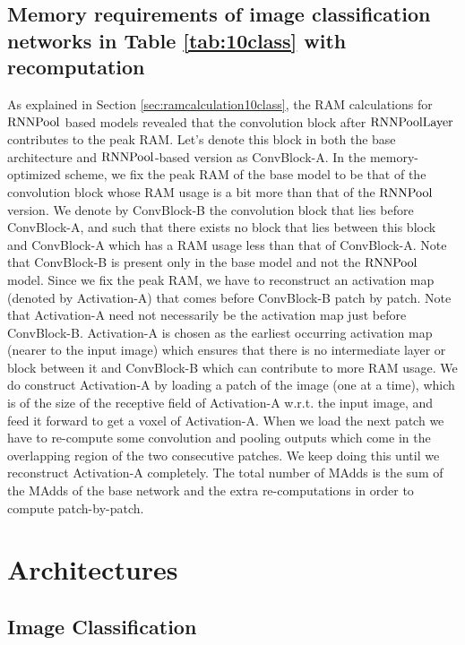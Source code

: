 \documentclass[10pt]{article}
\newcommand{\rpool}{\ensuremath{{\rm RNNPool}}\xspace}
\newcommand{\rpoollayer}{\ensuremath{{\rm RNNPoolLayer}}\xspace}
\begin{document}
\subsection{Memory requirements of image classification networks in Table \ref{tab:10class} with recomputation}
\label{sec:with-recomp}


As explained in Section \ref{sec:ramcalculation10class}, the RAM
calculations for \rpool based models revealed that the convolution
block after \rpoollayer contributes to the peak RAM. Let's denote this
block in both the base architecture and \rpool-based version as
ConvBlock-A. In the memory-optimized scheme, we fix the peak RAM of
the base model to be that of the convolution block whose RAM usage is
a bit more than that of the \rpool version. We denote by ConvBlock-B the
convolution block that lies before ConvBlock-A, and such that there
exists no block that lies between this block and ConvBlock-A which has
a RAM usage less than that of ConvBlock-A. Note that ConvBlock-B is
present only in the base model and not the \rpool model. Since we fix
the peak RAM, we have to reconstruct an activation map (denoted by
Activation-A) that comes before ConvBlock-B patch by patch. Note that Activation-A
need not necessarily be the activation map just before
ConvBlock-B. Activation-A is chosen as the earliest occurring
activation map (nearer to the input image) which ensures that there is no
intermediate layer or block between it and ConvBlock-B which can
contribute to more RAM usage. We do construct Activation-A
by loading a patch of the image (one at a time), which is of the size
of the receptive field of Activation-A w.r.t. the input image, and
feed it forward to get a 
voxel of Activation-A. When we load the next patch we have to
re-compute some convolution and pooling outputs which come in the
overlapping region of the two consecutive patches. We keep doing this
until we reconstruct Activation-A completely. The total number of MAdds is the sum of the MAdds of the base network and the extra re-computations in order to
compute patch-by-patch.
 \section{Architectures}
\label{sec:architectures}
\subsection{Image Classification}
\label{sec:arch-classification}
\end{document}
